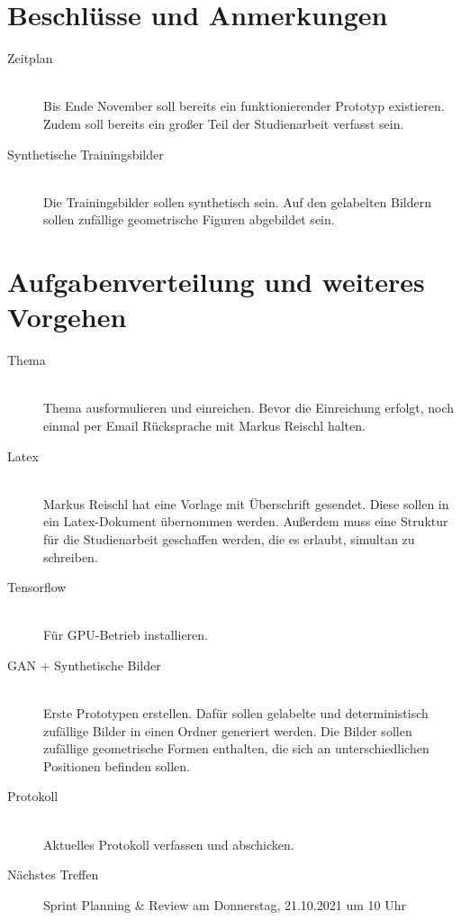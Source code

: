 \section{Beschlüsse und Anmerkungen}
\begin{description}
	\item[Zeitplan] \hfill \\
	Bis Ende November soll bereits ein funktionierender Prototyp existieren. Zudem soll bereits ein großer Teil der Studienarbeit verfasst sein.
	\item[Synthetische Trainingsbilder] \hfill \\
	Die Trainingsbilder sollen synthetisch sein. Auf den gelabelten Bildern sollen zufällige geometrische Figuren abgebildet sein.
\end{description}

\section{Aufgabenverteilung und weiteres Vorgehen}
\begin{description}
	\item[Thema] \hfill {}\\ 
	Thema ausformulieren und einreichen. Bevor die Einreichung erfolgt, noch einmal per Email Rücksprache mit Markus Reischl halten.
	
	\item[Latex] \hfill {}\\
	Markus Reischl hat eine Vorlage mit Überschrift gesendet. Diese sollen in ein Latex-Dokument übernommen werden. Außerdem muss eine Struktur für die Studienarbeit geschaffen werden, die es erlaubt, simultan zu schreiben. 
	
	\item[Tensorflow] \hfill {}\\
	Für GPU-Betrieb installieren.
	
	\item[GAN + Synthetische Bilder] \hfill {}\\
	Erste Prototypen erstellen. Dafür sollen gelabelte und deterministisch zufällige Bilder in einen Ordner generiert werden. Die Bilder sollen zufällige geometrische Formen enthalten, die sich an unterschiedlichen Positionen befinden sollen.
	
	\item[Protokoll] \hfill {}\\ 
	Aktuelles Protokoll verfassen und abschicken.
	
	\item[Nächstes Treffen] Sprint Planning \& Review am Donnerstag, 21.10.2021 um 10 Uhr 
\end{description}


